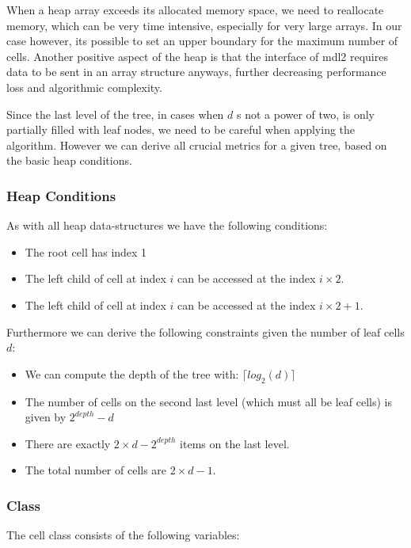 \documentclass[]{article}
\begin{document}
When a heap array exceeds its allocated memory space, we need to reallocate memory, which can be very time intensive, especially for very large arrays. In our case however, its possible to set an upper boundary for the maximum number of cells. Another positive aspect of the heap is that the interface of mdl2 requires data to be sent in an array structure anyways, further decreasing performance loss and algorithmic complexity.


Since the last level of the tree, in cases when $d$ s not a power of two, is only partially filled with leaf nodes, we need to be careful when applying the algorithm. However we can derive all crucial metrics for a given tree, based on the basic heap conditions.

\subsubsection{Heap Conditions}
As with all heap data-structures we have the following conditions:

\begin{itemize}
	\item The root cell has index 1
	\item The left child of cell at index $i$ can be accessed at the index $i\times2$. 
	\item The left child of cell at index $i$ can be accessed at the index $i\times2 + 1$. 
\end{itemize}

\vspace{0.5cm}
Furthermore we can derive the following constraints given the number of leaf cells $d$:

\begin{itemize}
	\item We can compute the depth of the tree with: $\lceil log_2(d) \rceil$
	\item The number of cells on the second last level (which must all be leaf cells) is given by $2^{depth} - d$ 
	\item There are exactly $2 \times d - 2^{depth}$ items on the last level. 
	\item The total number of cells are $2\times d - 1$.
\end{itemize}


\subsubsection{Class}
The cell class consists of the following variables:
\end{document}

